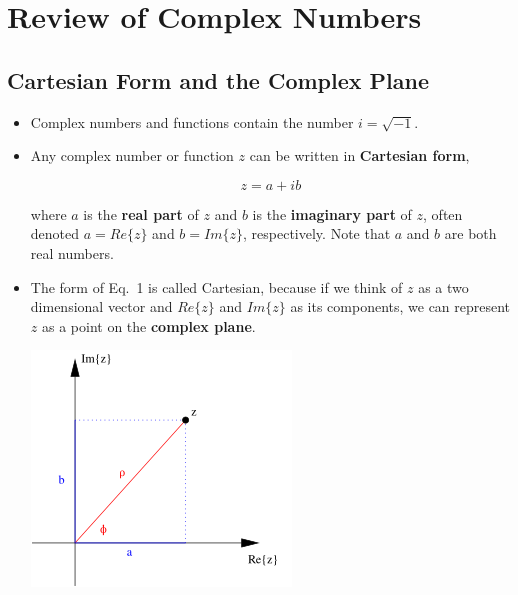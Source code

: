 \documentclass[12pt]{article}
\begin{document}
\section*{Review of Complex Numbers}

\subsection*{Cartesian Form and the Complex Plane}
\begin{itemize}
\item Complex numbers and functions contain the number
  $i = \sqrt{-1}$.

\item Any complex number or function $z$ can be written in
  \textbf{Cartesian form},

  \begin{equation}
    \label{eq:z}
    z = a + i b
  \end{equation}

  \noindent
  where $a$ is the \textbf{real part} of $z$ and $b$ is the
  \textbf{imaginary part} of $z$, often denoted $a = Re\{z\}$ and
  $b = Im\{z\}$, respectively. Note that $a$ and $b$ are both real numbers.

\item The form of Eq.~1%
  is called Cartesian, because if we think of $z$ as a two dimensional
  vector and $Re\{z\}$ and $Im\{z\}$ as its components, we can
  represent $z$ as a point on the \textbf{complex plane}.

  \begin{center}
    \includegraphics{complex.png}
  \end{center}

\end{itemize}
\end{document}
